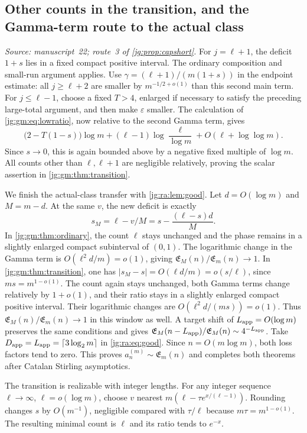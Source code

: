 \documentclass[11pt,a4paper]{article}
\theoremstyle{definition}\newaliascnt{definition}{theorem}
\theoremstyle{remark}\newaliascnt{remark}{theorem}
\begin{document}
\subsection{Other counts in the transition, and the Gamma-term route to the actual class}
\label{jg:sec:gm-transfer}
\emph{Source: manuscript~22; route~3 of \cref{jg:prop:capshort}.} For
$j=\ell+1$, the deficit $1+s$ lies in a fixed compact positive interval. The
ordinary composition and small-run argument applies. Use
$\gamma=(\ell+1)/(m(1+s))$ in the endpoint estimate: all $j\ge\ell+2$ are smaller
by $m^{-1/2+o(1)}$ than this second main term. For $j\le\ell-1$, choose a fixed
$T>4$, enlarged if necessary to satisfy the preceding large-total argument, and
then make $\varepsilon$ smaller. The calculation of \eqref{jg:gm:eq:lowratio},
now relative to the second Gamma term, gives
\[
 \bigl(2-T(1-s)\bigr)\log m
 +(\ell-1)\log\frac{\ell}{\log m}
 +O(\ell+\log\log m).
\]
Since $s\to0$, this is again bounded above by a negative fixed multiple of
$\log m$. All counts other than $\ell,\ell+1$ are negligible relatively, proving
the scalar assertion in \cref{jg:gm:thm:transition}.

We finish the actual-class transfer with \cref{jg:ra:lem:good}. Let
$d=O(\log m)$ and $M=m-d$. At the same $v$, the new deficit is exactly
\[
 s_M=\ell-v/M=s-\frac{(\ell-s)d}{M}.
\]
In \cref{jg:gm:thm:ordinary}, the count $\ell$ stays unchanged and the phase
remains in a slightly enlarged compact subinterval of $(0,1)$. The logarithmic
change in the Gamma term is $O(\ell^2d/m)=o(1)$, giving
$\mathfrak E_M(n)/\mathfrak E_m(n)\to1$. In \cref{jg:gm:thm:transition}, one has
$|s_M-s|=O(\ell d/m)=o(s/\ell)$, since $ms=m^{1-o(1)}$. The count again stays
unchanged, both Gamma terms change relatively by $1+o(1)$, and their ratio stays
in a slightly enlarged compact positive interval. Their logarithmic changes are
$O(\ell^2d/(ms))=o(1)$. Thus $\mathfrak E_M(n)/\mathfrak E_m(n)\to1$ in this
window as well. A target shift of $L_{\rm app}=O(\log m)$ preserves the same
conditions and gives $\mathfrak E_M(n-L_{\rm app})/\mathfrak E_M(n)\sim
4^{-L_{\rm app}}$. Take $D_{\rm app}=L_{\rm app}=\lceil3\log_2m\rceil$ in
\eqref{jg:ra:eq:good}. Since $n=O(m\log m)$, both loss factors tend to zero.
This proves $a_n^{(m)}\sim\mathfrak E_m(n)$ and completes both theorems after
Catalan Stirling asymptotics.

The transition is realizable with integer lengths. For any integer sequence
$\ell\to\infty$, $\ell=o(\log m)$, choose $v$ nearest
$m(\ell-\tau e^{x/(\ell-1)})$. Rounding changes $s$ by $O(m^{-1})$, negligible
compared with $\tau/\ell$ because $m\tau=m^{1-o(1)}$. The resulting minimal
count is $\ell$ and its ratio tends to $e^{-x}$.
\end{document}
